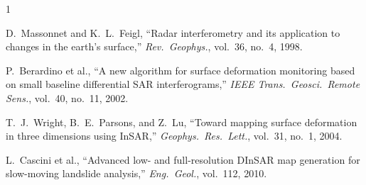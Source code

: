\documentclass[conference]{IEEEtran}
\begin{document}
\begin{thebibliography}{1}

D.~Massonnet and K.~L.~Feigl, ``Radar interferometry and its
application to changes in the earth's surface,''
\textit{Rev.\ Geophys.}, vol.~36, no.~4, 1998.

P.~Berardino et al., ``A new algorithm for surface deformation
monitoring based on small baseline differential SAR interferograms,''
\textit{IEEE Trans.\ Geosci.\ Remote Sens.}, vol.~40, no.~11, 2002.

T.~J.~Wright, B.~E.~Parsons, and Z.~Lu, ``Toward mapping surface
deformation in three dimensions using InSAR,''
\textit{Geophys.\ Res.\ Lett.}, vol.~31, no.~1, 2004.

L.~Cascini et al., ``Advanced low- and full-resolution DInSAR map
generation for slow-moving landslide analysis,''
\textit{Eng.\ Geol.}, vol.~112, 2010.

\end{thebibliography}
\end{document}

